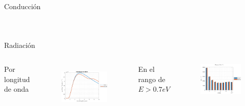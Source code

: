 \documentclass[spanish,a4paper]{beamer}%
\newcommand{\resRadPath}{\graphicspath{{./figuras/Resultados/radiacion/}}}
\begin{document}
\begin{frame}{Conducción}
\begin{columns}
\begin{figure}[h]
								\label{fig:SiCSiO2Ge_condRc}%
						\end{figure}
						\vfill
				\end{columns}							
		\end{frame}
		\begin{frame}{Radiación}
			\resRadPath
			\begin{columns}
						\begin{block}{\centering Por longitud de onda}
						\end{block}
					\vspace{15pt}
						\begin{figure}[h]%
								\centering
										\includegraphics[width=\columnwidth]{SiCvsSi_rad}
								\label{fig:SiCGevsSiGe_rad}%
						\end{figure}
						\vfill
					\vspace{-10pt}
						\begin{block}{\centering En el rango de $E>0.7eV$}
							\end{block}
					\vspace{10pt}
						\begin{figure}[h]%
								\centering
										\includegraphics[width=\columnwidth]{SiCvsSi}%

\end{figure}
\end{columns}
\end{frame}
\end{document}

